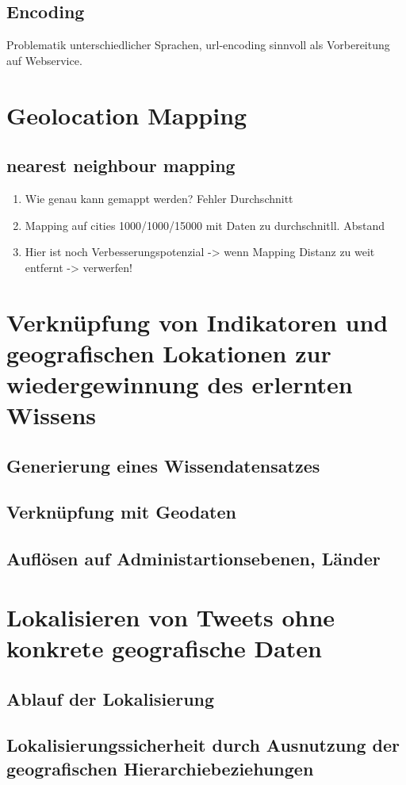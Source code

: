 	\subsection{Encoding}
		Problematik unterschiedlicher Sprachen, 
		url-encoding sinnvoll als Vorbereitung auf Webservice. 

\section{Geolocation Mapping}

	\subsection{nearest neighbour mapping}
		\begin{enumerate}
			\item {} Wie genau kann gemappt werden? Fehler Durchschnitt
			\item Mapping auf cities 1000/1000/15000 mit Daten zu durchschnitll. Abstand
			\item Hier ist noch Verbesserungspotenzial -> wenn Mapping Distanz zu weit entfernt -> verwerfen! 
		\end{enumerate} 

\section{Verknüpfung von Indikatoren und geografischen Lokationen zur wiedergewinnung des erlernten Wissens}
	
	\subsection{Generierung eines Wissendatensatzes}

	\subsection{Verknüpfung mit Geodaten}

	\subsection{Auflösen auf Administartionsebenen, Länder}

\section{Lokalisieren von Tweets ohne konkrete geografische Daten}
	
	\subsection{Ablauf der Lokalisierung}
	
	\subsection{Lokalisierungssicherheit durch Ausnutzung der geografischen Hierarchiebeziehungen}





